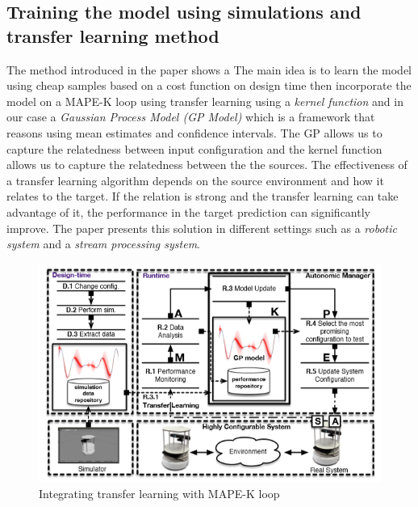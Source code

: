 \documentclass[pdftex,english,oribibl]{llncs}
\begin{document}
\subsection{Training the model using simulations and transfer learning method}
The method introduced in the paper \cite{transferLearning} shows a 
The main idea is to learn the model using cheap samples based on a cost function on design time then incorporate the model on a MAPE-K loop using transfer learning using a \textit{kernel function} and in our case a \textit{Gaussian Process Model (GP Model)} which is a framework that reasons using mean estimates and confidence intervals. The GP allows us to capture the relatedness between input configuration and the kernel function allows us to capture the relatedness between the the sources. The effectiveness of a transfer learning algorithm depends on the source environment and how it relates to the target. If the relation is strong and the transfer learning can take advantage of it, the performance in the target prediction can significantly improve. The paper \citep{transferLearning} presents this solution in different settings such as a \textit{robotic system} and a \textit{stream processing system}. 
\begin{figure}[H]
\centering
	\includegraphics[totalheight=8cm]{figures/transferlearning}
    \caption{Integrating transfer learning with MAPE-K loop \cite{transferLearning}}
    \label{fig:transferlearning}
\end{figure}
\end{document}

